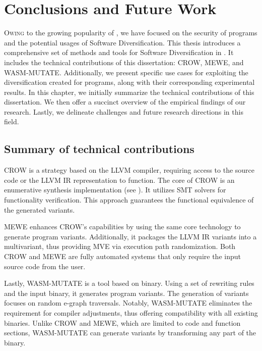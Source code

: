 
\chapter{Conclusions and Future Work}
\label{results}


\lettrine[lines=3]{O}{wing} to the growing popularity of \Wasm, we have focused on the security of \Wasm programs and the potential usages of Software Diversification.
This thesis introduces a comprehensive set of methods and tools for Software Diversification in \Wasm.
It includes the technical contributions of this dissertation: CROW, MEWE, and WASM-MUTATE.
Additionally, we present specific use cases for exploiting the diversification created for \Wasm programs, along with their corresponding experimental results.
In this chapter, we initially summarize the technical contributions of this dissertation.
We then offer a succinct overview of the empirical findings of our research.
Lastly, we delineate challenges and future research directions in this field.

\section{Summary of technical contributions}

CROW is a strategy based on the LLVM compiler, requiring access to the source code or the LLVM IR representation to function. 
The core of CROW is an enumerative synthesis implementation (see ). 
It utilizes SMT solvers for functionality verification. 
This approach guarantees the functional equivalence of the generated variants.

MEWE enhances CROW's capabilities by using the same core technology to generate program variants. 
Additionally, it packages the LLVM IR variants into a \Wasm multivariant, thus providing MVE via execution path randomization. 
Both CROW and MEWE are fully automated systems that only require the input source code from the user. 

Lastly, WASM-MUTATE is a tool based on binary. 
Using a set of rewriting rules and the input \wasm binary, it generates program variants.
The generation of \Wasm variants focuses on random e-graph traversals. 
Notably, WASM-MUTATE eliminates the requirement for compiler adjustments, thus offering compatibility with all existing \Wasm binaries. 
Unlike CROW and MEWE, which are limited to code and function sections, WASM-MUTATE can generate variants by transforming any part of the \wasm binary.

